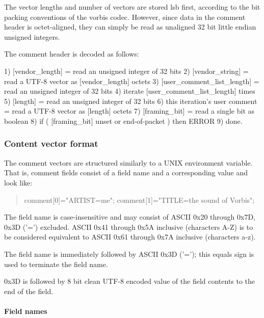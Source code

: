 The vector lengths and number of vectors are stored lsb first, according
to the bit packing conventions of the vorbis codec. However, since data
in the comment header is octet-aligned, they can simply be read as
unaligned 32 bit little endian unsigned integers.

The comment header is decoded as follows:

\begin{programlisting}
  1) [vendor_length] = read an unsigned integer of 32 bits
  2) [vendor_string] = read a UTF-8 vector as [vendor_length] octets
  3) [user_comment_list_length] = read an unsigned integer of 32 bits
  4) iterate [user_comment_list_length] times {
       5) [length] = read an unsigned integer of 32 bits
       6) this iteration's user comment = read a UTF-8 vector as [length] octets
     }
  7) [framing_bit] = read a single bit as boolean
  8) if ( [framing_bit] unset or end-of-packet ) then ERROR
  9) done.
\end{programlisting}




\subsubsection{Content vector format}

The comment vectors are structured similarly to a UNIX environment variable.
That is, comment fields consist of a field name and a corresponding value and
look like:

\begin{quote}
\begin{programlisting}
comment[0]="ARTIST=me";
comment[1]="TITLE=the sound of Vorbis";
\end{programlisting}
\end{quote}

The field name is case-insensitive and may consist of ASCII 0x20
through 0x7D, 0x3D ('=') excluded. ASCII 0x41 through 0x5A inclusive
(characters A-Z) is to be considered equivalent to ASCII 0x61 through
0x7A inclusive (characters a-z).


The field name is immediately followed by ASCII 0x3D ('=');
this equals sign is used to terminate the field name.


0x3D is followed by 8 bit clean UTF-8 encoded value of the
field contents to the end of the field.


\paragraph{Field names}

